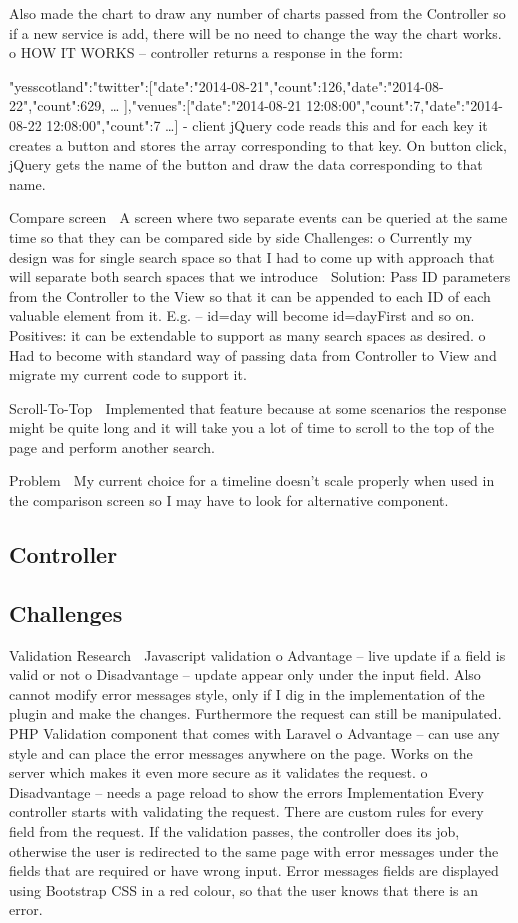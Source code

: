 \documentclass{l4proj}
\begin{document}
Also made the chart to draw any number of charts passed from the Controller so if a new service is add, there will be no need to change the way the chart works.
o HOW IT WORKS – controller returns a response in the form: {"yesscotland":{"twitter":[{"date":"2014-08-21","count":126},{"date":"2014-08-22","count":629}, … ],"venues":[{"date":"2014-08-21 12:08:00","count":7},{"date":"2014-08-22 12:08:00","count":7} …]} - client jQuery code reads this and for each key it creates a button and stores the array corresponding to that key. On button click, jQuery gets the name of the button and draw the data corresponding to that name.


Compare screen
 A screen where two separate events can be queried at the same time so that they can be compared side by side
Challenges:
o Currently my design was for single search space so that I had to come up with approach that will separate both search spaces that we introduce
 Solution: Pass ID parameters from the Controller to the View so that it can be appended to each ID of each valuable element from it. E.g. – id=day will become id=dayFirst and so on.
 Positives: it can be extendable to support as many search spaces as desired.
o Had to become with standard way of passing data from Controller to View and migrate my current code to support it.

Scroll-To-Top
 Implemented that feature because at some scenarios the response might be quite long and it will take you a lot of time to scroll to the top of the page and perform another search.

Problem
 My current choice for a timeline doesn’t scale properly when used in the comparison screen so I may have to look for alternative component.

\subsection{Controller}

\subsection{Challenges}



Validation
Research
 Javascript validation
o Advantage – live update if a field is valid or not
o Disadvantage – update appear only under the input field. Also cannot modify error messages style, only if I dig in the implementation of the plugin and make the changes. Furthermore the request can still be manipulated.
 PHP Validation component that comes with Laravel
o Advantage – can use any style and can place the error messages anywhere on the page. Works on the server which makes it even more secure as it validates the request.
o Disadvantage – needs a page reload to show the errors
Implementation
Every controller starts with validating the request. There are custom rules for every field from the request. If the validation passes, the controller does its job, otherwise the user is redirected to the same page with error messages under the fields that are required or have wrong input. Error messages fields are displayed using Bootstrap CSS in a red colour, so that the user knows that there is an error.

}
\end{document}
